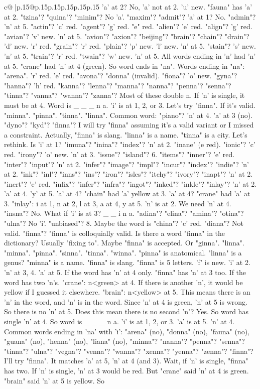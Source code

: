 \documentclass{article}
\begin{document}
{\begin{supertabular}{c@{$\;$}|p{.15\linewidth}@{}p{.15\linewidth}p{.15\linewidth}p{.15\linewidth}p{.15\linewidth}p{.15\linewidth}}
{{{'a' at 2? No, 'a' not at 2. 'u' new. "fauna" has 'a' at 2. "tzina"? "quina"? "minim"? No 'a'. "maxim"? "admit"? 'a' at 1? No. "admin"? 'n' at 5. "actin"? 'c' red. "agent"? 'g' red. "e" red. "alien"? 'e' red. "align"? 'g' red. "avian"? 'v' new. 'n' at 5. "avion"? "axion"? "beijing"? "brain"? "chain"? "drain"? 'd' new. 'r' red. "grain"? 'r' red. "plain"? 'p' new. 'l' new. 'n' at 5. "stain"? 's' new. 'n' at 5. "train"? 'r' red. "twain"? 'w' new. 'n' at 5. All words ending in 'n' had 'n' at 5. "crane" had 'n' at 4 (green). So word ends in "na". Words ending in "na": "arena". 'r' red. 'e' red. "avona"? "donna" (invalid). "fiona"? 'o' new. "gyna"? "hanna"? 'h' red. "kanna"? "lenna"? "manna"? "nanna"? "penna"? "senna"? "tinna"? "vanna"? "wanna"? "zanna"? Most of these double n. If 'n' is single, it must be at 4. Word is \_ \_ \_ n a. 'i' is at 1, 2, or 3. Let's try "finna". If it's valid. "minna". "pinna". "tinna". "linna". Common word: "piano"? 'n' at 4. 'a' at 3 (no). "dyno"? "kyd"? "finna"? I will try "finna" assuming it's a valid variant or I missed a constraint. Actually, "finna" is slang. "linna" is a name. "tinna" is a city. Let's rethink. Is 'i' at 1? "imuna"? "inina"? "index"? 'n' at 2. "inane" (e red). "ionic"? 'c' red. "irony"? 'o' new. 'n' at 3. "issue"? "island"? 6. "items"? "inner"? 'e' red. "inter"? "input"? 'n' at 2. "infer"? "image"? "impl"? "incur"? "index"? "indie"? 'n' at 2. "ink"? "inl"? "inns"? "ins"? "iron"? "isles"? "itchy"? "ivory"? "inapt"? 'n' at 2. "inert"? 'e' red. "infix"? "infer"? "infra"? "ingot"? "inked"? "inkle"? "inlay"? 'n' at 2. 'a' at 4. 'y' at 5. 'a' at 4? "chain" had 'a' yellow at 3. 'a' at 4? "crane" had 'a' at 3. "inlay": i at 1, n at 2, l at 3, a at 4, y at 5. 'n' is at 2. We need 'n' at 4. "insna"? No. What if 'i' is at 3? \_ \_ i n a. "adina"? "elina"? "amina"? "otina"? "ulna"? No 'i'. "unbiased"? 8. Maybe the word is "china"? 'c' red. "diana"? Not valid. "finna"? "finna" is colloquially valid. Is there a word "finna" in the dictionary? Usually "fixing to". Maybe "finna" is accepted. Or "ginna". "linna". "minna". "pinna". "sinna". "tinna". "winna". "pinna" is anatomical. "linna" is a genus? "minna" is a name. "finna" is slang. "finna" is 5 letters. 'f' is new. 'i' at 2. 'n' at 3, 4. 'a' at 5. If the word has 'n' at 4 only. "finna" has 'n' at 3 too. If the word has two 'n's. "crane": n<green> at 4. If there is another 'n', it would be yellow if I guessed it elsewhere. "brain": n<yellow> at 5. This means there is an 'n' in the word, and 'n' is in the word. Since 'n' at 4 is green, 'n' at 5 is wrong. So there is no 'n' at 5. Does this mean there is no second 'n'? Yes. So word has single 'n' at 4. So word is \_ \_ \_ n a. 'i' is at 1, 2, or 3. 'a' is at 5. 'n' at 4. Common words ending in 'na' with 'i': "arena" (no), "donna" (no), "fauna" (no), "guana" (no), "henna" (no), "liana" (no), "minna"? "nanna"? "penna"? "senna"? "tinna"? "ulna"? "vegna"? "venna"? "wanna"? "xenna"? "yenna"? "zenna"? "finna"? I'll try "finna". It matches 'a' at 5, 'n' at 4 (and 3). Wait, if 'n' is single, "finna" has two. If 'n' is single, 'n' at 3 would be red. But "crane" said 'n' at 4 is green. "brain" said 'n' at 5 is yellow. So }}}
\end{supertabular}}
\end{document}
